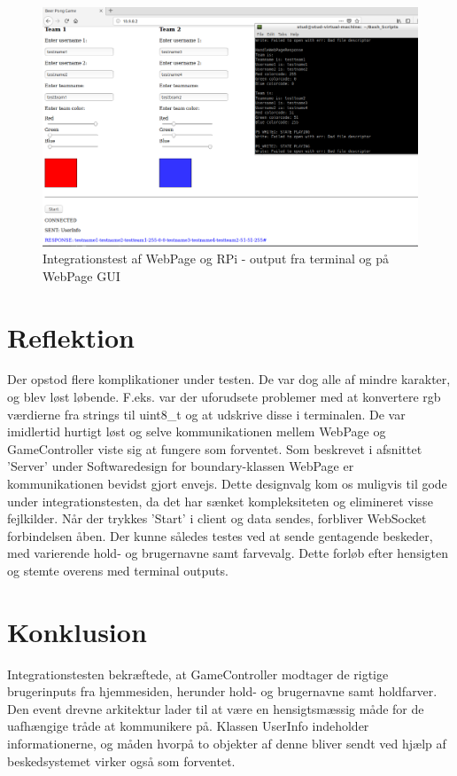 \documentclass[Integrationstest/Integrationstest_main.tex]{subfiles}
\begin{document}
\begin{figure}[H]
    \centering
    \includegraphics[width=1\textwidth]{Integrationstest/WebPageogRPi/graphics/webserver.png}
    \caption{Integrationstest af WebPage og RPi - output fra terminal og på WebPage GUI}
    \label{fig:Integration_3}
\end{figure}

\section{Reflektion}
Der opstod flere komplikationer under testen. De var dog alle af mindre karakter, og blev løst løbende. F.eks. var der uforudsete problemer med at konvertere rgb værdierne fra strings til uint8\_t og at udskrive disse i terminalen. De var imidlertid hurtigt løst og selve kommunikationen mellem WebPage og GameController viste sig at fungere som forventet. Som beskrevet i afsnittet 'Server' under Softwaredesign for boundary-klassen WebPage er kommunikationen bevidst gjort envejs. Dette designvalg kom os muligvis til gode under integrationstesten, da det har sænket kompleksiteten og elimineret visse fejlkilder. Når der trykkes 'Start' i client og data sendes, forbliver WebSocket forbindelsen åben. Der kunne således testes ved at sende gentagende beskeder, med varierende hold- og brugernavne samt farvevalg. Dette forløb efter hensigten og stemte overens med terminal outputs. 

\section{Konklusion}
Integrationstesten bekræftede, at GameController modtager de rigtige brugerinputs fra hjemmesiden, herunder hold- og brugernavne samt holdfarver. Den event drevne arkitektur lader til at være en hensigtsmæssig måde for de uafhængige tråde at kommunikere på. Klassen UserInfo indeholder informationerne, og måden hvorpå to objekter af denne bliver sendt ved hjælp af beskedsystemet virker også som forventet.
\end{document}
